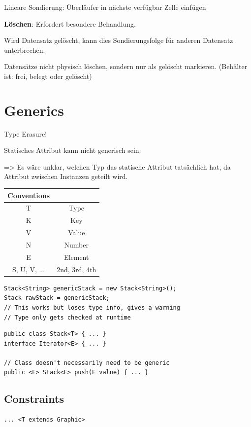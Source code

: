 \begin{multicols*}{4}
		Lineare Sondierung: Überläufer in nächste verfügbar Zelle einfügen
		
		\textbf{Löschen}: Erfordert besondere Behandlung.
		
		Wird Datensatz gelöscht, kann dies Sondierungsfolge für anderen Datensatz unterbrechen.
		
		Datensätze nicht physisch löschen, sondern nur als gelöscht markieren. (Behälter ist: frei, belegt oder gelöscht)

\section{Generics}
Type Erasure!

Statisches Attribut kann nicht generisch sein.

=> Es wäre unklar, welchen Typ das statische Attribut tatsächlich hat, da Attribut zwischen Instanzen geteilt wird.

	\begin{tabular}{c | c}
		\textbf{Conventions} &  \\
		\hline
		T & Type \\
		K & Key \\
		V & Value \\
		N & Number \\
		E & Element \\
		S, U, V, ... & 2nd, 3rd, 4th \\
	\end{tabular}

	\begin{lstlisting}
Stack<String> genericStack = new Stack<String>();
Stack rawStack = genericStack;
// This works but loses type info, gives a warning
// Type only gets checked at runtime
	\end{lstlisting}

\vspace{5pt}

	\begin{lstlisting}
public class Stack<T> { ... }
interface Iterator<E> { ... }

// Class doesn't necessarily need to be generic
public <E> Stack<E> push(E value) { ... }
	\end{lstlisting}

	\subsection{Constraints}
		\begin{lstlisting}
... <T extends Graphic>


\end{lstlisting}
\end{multicols*}

